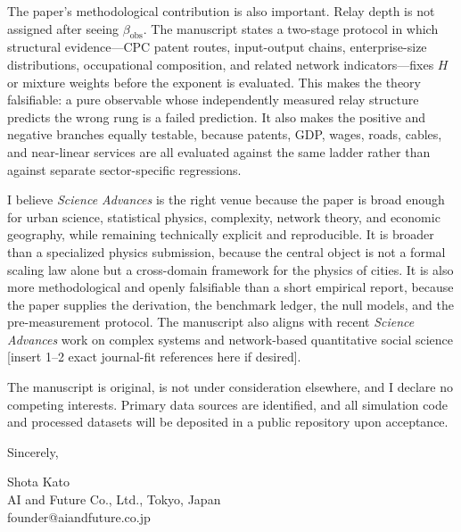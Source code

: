 \documentclass[11pt]{article}
\begin{document}
The paper's methodological contribution is also important. Relay depth is not assigned after seeing \(\beta_{\mathrm{obs}}\). The manuscript states a two-stage protocol in which structural evidence---CPC patent routes, input-output chains, enterprise-size distributions, occupational composition, and related network indicators---fixes \(H\) or mixture weights before the exponent is evaluated. This makes the theory falsifiable: a pure observable whose independently measured relay structure predicts the wrong rung is a failed prediction. It also makes the positive and negative branches equally testable, because patents, GDP, wages, roads, cables, and near-linear services are all evaluated against the same ladder rather than against separate sector-specific regressions.

I believe \emph{Science Advances} is the right venue because the paper is broad enough for urban science, statistical physics, complexity, network theory, and economic geography, while remaining technically explicit and reproducible. It is broader than a specialized physics submission, because the central object is not a formal scaling law alone but a cross-domain framework for the physics of cities. It is also more methodological and openly falsifiable than a short empirical report, because the paper supplies the derivation, the benchmark ledger, the null models, and the pre-measurement protocol. The manuscript also aligns with recent \emph{Science Advances} work on complex systems and network-based quantitative social science [insert 1--2 exact journal-fit references here if desired].

The manuscript is original, is not under consideration elsewhere, and I declare no competing interests. Primary data sources are identified, and all simulation code and processed datasets will be deposited in a public repository upon acceptance.

Sincerely,

Shota Kato\\
AI and Future Co., Ltd., Tokyo, Japan\\
founder@aiandfuture.co.jp
\end{document}
